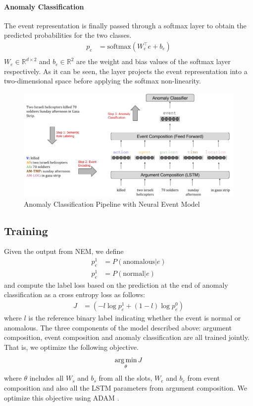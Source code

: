 \paragraph{Anomaly Classification} The event representation is finally passed through a softmax layer to obtain
the predicted probabilities for the two classes.
\begin{align}
 p_e & = \text{softmax}(W_e^\intercal e + b_e) \\
\end{align}
$W_e \in \mathbb{R}^{d \times 2}$ and $b_e \in \mathbb{R}^2$ are the weight and bias values of the softmax layer respectively.
As it can be seen, the layer projects the event representation into a two-dimensional space before applying the softmax non-linearity.

\begin{figure}
  \begin{center}
  \includegraphics[width=6.5in]{figures/nem_pipeline.png}
  \caption{Anomaly Classification Pipeline with Neural Event Model}
  \label{fig:nem}
  \end{center}
\end{figure}

\subsection{Training}
Given the output from NEM, we define
\begin{align}
 p^1_e &= P(\text{anomalous} | e) \\
 p^1_e &= P(\text{normal} | e)
\end{align}
and compute the label loss based on the prediction at the end of anomaly classification as a cross entropy loss as follows:
\begin{align}
J &= \left( - l \log p^1_e + (1-l) \log p^0_e \right)
\end{align}
where $l$ is the reference binary label indicating whether the event is normal or
anomalous. The three components of the model described above: argument composition, event composition and anomaly classification are all trained jointly.
That is, we optimize the following objective.
\begin{equation}
 \operatorname*{arg\,min}_{\theta} J
\end{equation}
where $\theta$ includes all $W_s$ and $b_s$ from all the slots, $W_e$ and $b_e$ from event composition and also all the LSTM parameters from argument composition.
We optimize this objective using ADAM \citep{kingma2014adam}. 

